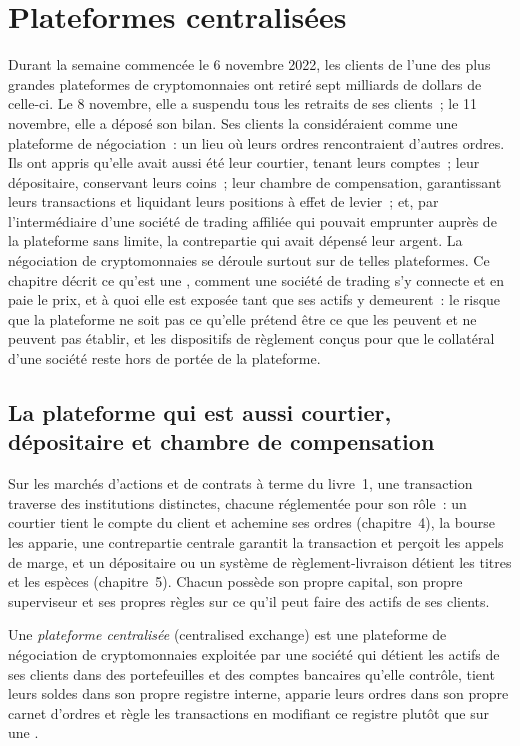 \chapter{Plateformes centralisées}\label{ch:m3:centralised-exchanges}

Durant la semaine commencée le 6 novembre 2022, les clients de l'une des plus grandes plateformes de cryptomonnaies ont retiré
sept milliards de dollars de celle-ci. Le 8 novembre, elle a suspendu tous les retraits de ses clients~; le 11 novembre, elle a déposé
son bilan. Ses clients la considéraient comme une plateforme de négociation~: un lieu où
leurs ordres rencontraient d'autres ordres. Ils ont appris qu'elle avait aussi été leur courtier, tenant leurs comptes~;
leur dépositaire, conservant leurs coins~; leur chambre de compensation, garantissant leurs transactions et liquidant
leurs positions à effet de levier~; et, par l'intermédiaire d'une société de trading affiliée qui pouvait emprunter auprès de la plateforme
sans limite, la contrepartie qui avait dépensé leur argent. La négociation de cryptomonnaies se déroule surtout sur de telles
plateformes. Ce chapitre décrit ce qu'est une , comment une société de trading s'y connecte et en paie
le prix, et à quoi elle est exposée tant que ses actifs y demeurent~: le risque que la plateforme ne soit pas ce qu'elle prétend être
ce que les  peuvent et ne peuvent pas établir, et les dispositifs de règlement
conçus pour que le collatéral d'une société reste hors de portée de la plateforme.

\section{La plateforme qui est aussi courtier, dépositaire et chambre de compensation}

Sur les marchés d'actions et de contrats à terme du livre~1, une transaction traverse des institutions distinctes,
chacune réglementée pour son rôle~: un courtier tient le compte du client et achemine ses ordres (chapitre~4), la bourse les apparie,
une contrepartie centrale garantit la transaction et perçoit les appels de marge, et un dépositaire ou un système de règlement-livraison
détient les titres et les espèces (chapitre~5). Chacun possède son propre capital, son propre superviseur et ses propres règles
sur ce qu'il peut faire des actifs de ses clients.

\begin{definition}\label{def:m3:centralised-exchanges:cex}
Une \emph{plateforme centralisée} (centralised exchange) est une plateforme de négociation de cryptomonnaies exploitée par une société
qui détient les actifs de ses clients dans des portefeuilles et des comptes bancaires qu'elle contrôle, tient leurs soldes dans son propre
registre interne, apparie leurs ordres dans son propre carnet d'ordres et règle les transactions en modifiant ce registre
plutôt que sur une .
\end{definition}

